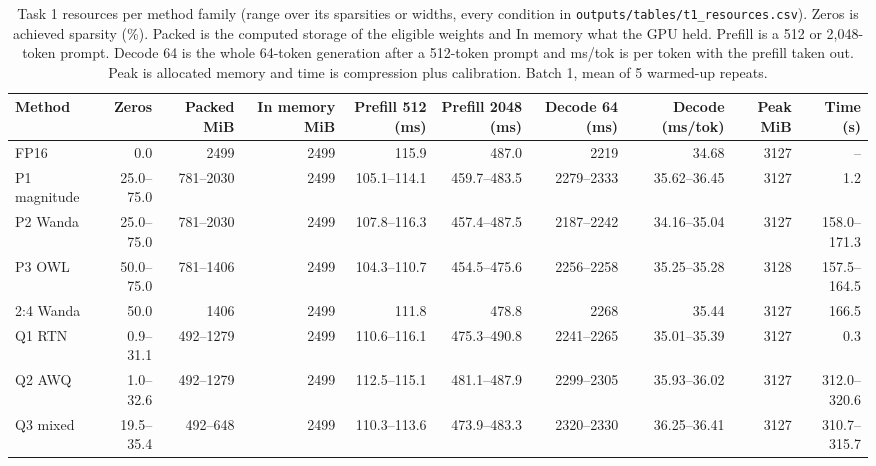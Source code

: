 \begin{table}[!htb]
\centering
\scriptsize
\setlength{\tabcolsep}{3.5pt}
\caption{Task 1 resources per method family (range over its sparsities or widths, every condition in \texttt{outputs/tables/t1\_resources.csv}). Zeros is achieved sparsity (\%). Packed is the computed storage of the eligible weights and In memory what the GPU held. Prefill is a 512 or 2,048-token prompt. Decode 64 is the whole 64-token generation after a 512-token prompt and ms/tok is per token with the prefill taken out. Peak is allocated memory and time is compression plus calibration. Batch 1, mean of 5 warmed-up repeats.}
\label{tab:t1ressum}
\begin{adjustbox}{max width=\linewidth}
\begin{tabular}{lrrrrrrrrr}
\toprule
Method & Zeros & Packed MiB & In memory MiB & Prefill 512 (ms) & Prefill 2048 (ms) & Decode 64 (ms) & Decode (ms/tok) & Peak MiB & Time (s) \\
\midrule
FP16 & 0.0 & 2499 & 2499 & 115.9 & 487.0 & 2219 & 34.68 & 3127 & -- \\
P1 magnitude & 25.0--75.0 & 781--2030 & 2499 & 105.1--114.1 & 459.7--483.5 & 2279--2333 & 35.62--36.45 & 3127 & 1.2 \\
P2 Wanda & 25.0--75.0 & 781--2030 & 2499 & 107.8--116.3 & 457.4--487.5 & 2187--2242 & 34.16--35.04 & 3127 & 158.0--171.3 \\
P3 OWL & 50.0--75.0 & 781--1406 & 2499 & 104.3--110.7 & 454.5--475.6 & 2256--2258 & 35.25--35.28 & 3128 & 157.5--164.5 \\
2:4 Wanda & 50.0 & 1406 & 2499 & 111.8 & 478.8 & 2268 & 35.44 & 3127 & 166.5 \\
Q1 RTN & 0.9--31.1 & 492--1279 & 2499 & 110.6--116.1 & 475.3--490.8 & 2241--2265 & 35.01--35.39 & 3127 & 0.3 \\
Q2 AWQ & 1.0--32.6 & 492--1279 & 2499 & 112.5--115.1 & 481.1--487.9 & 2299--2305 & 35.93--36.02 & 3127 & 312.0--320.6 \\
Q3 mixed & 19.5--35.4 & 492--648 & 2499 & 110.3--113.6 & 473.9--483.3 & 2320--2330 & 36.25--36.41 & 3127 & 310.7--315.7 \\
\bottomrule
\end{tabular}
\end{adjustbox}
\end{table}
